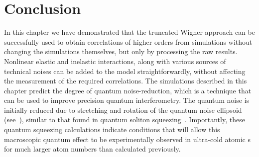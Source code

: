 \section{Conclusion}

In this chapter we have demonstrated that the truncated Wigner approach can be successfully used to obtain correlations of higher orders from simulations without changing the simulations themselves, but only by processing the raw results.
Nonlinear elastic and inelastic interactions, along with various sources of technical noises can be added to the model straightforwardly, without affecting the measurement of the required correlations.
The simulations described in this chapter predict the degree of quantum noise-reduction, which is a technique that can be used to improve precision quantum interferometry.
The quantum noise is initially reduced due to stretching and rotation of the quantum noise ellipsoid (see~), similar to that found in quantum soliton squeezing~\cite{Carter1987,Drummond1993a}.
Importantly, these quantum squeezing calculations indicate conditions that will allow this macroscopic quantum effect to be experimentally observed in ultra-cold atomic s for much larger atom numbers than calculated previously.
